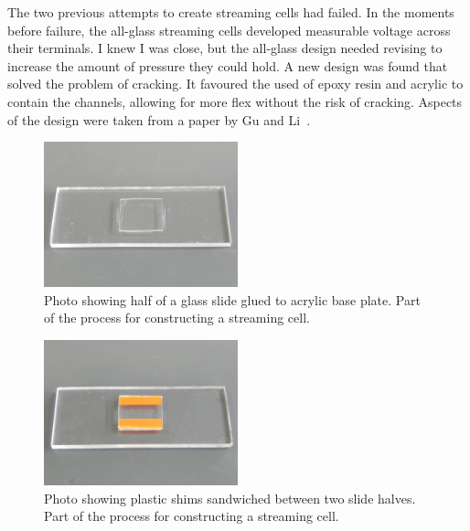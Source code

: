     The two previous attempts to create streaming cells had failed.
    In the moments before failure, the all-glass streaming cells developed measurable voltage across their terminals.
    I knew I was close, but the all-glass design needed revising to increase the amount of pressure they could hold.
    A new design was found that solved the problem of cracking.
    It favoured the used of epoxy resin and acrylic to contain the channels, allowing for more flex without the risk of cracking.
    Aspects of the design were taken from a paper by Gu and Li~\cite{Gu2000}.

    \begin{figure}[p]
      \centering
      \includegraphics[width=0.5\textwidth]{content/pt1/01-PowerHarvesting/graphics/Photo_streamingPotential_Assembly_Step1.JPG}
      \caption{\label{fig:Photo_streamingPotential_Assembly_Step1}Photo showing half of a glass slide glued to acrylic base plate. Part of the process for constructing a streaming cell.}
    \end{figure}
    \begin{figure}[p]
      \centering
      \includegraphics[width=0.5\textwidth]{content/pt1/01-PowerHarvesting/graphics/Photo_streamingPotential_Assembly_Step2.JPG}
      \caption{\label{fig:Photo_streamingPotential_Assembly_Step2}Photo showing plastic shims sandwiched between two slide halves. Part of the process for constructing a streaming cell.}
    \end{figure}
